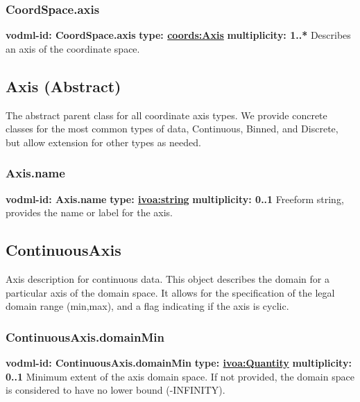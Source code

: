     \subsubsection{CoordSpace.axis}
      \textbf{vodml-id: CoordSpace.axis} \newline
      \textbf{type: \hyperref[sect:Axis]{coords:Axis}} \newline
      \textbf{multiplicity: 1..*} \newline 
      Describes an axis of the coordinate space.


  \subsection{Axis (Abstract)}
  \label{sect:Axis}
    The abstract parent class for all coordinate axis types. We provide concrete classes for the most common types of data, Continuous, Binned, and Discrete, but allow extension for other types as needed.

    \subsubsection{Axis.name}
      \textbf{vodml-id: Axis.name} \newline
      \textbf{type: \hyperref[sect:ivoa]{ivoa:string}} \newline
      \textbf{multiplicity: 0..1} \newline 
      Freeform string, provides the name or label for the axis.

  \subsection{ContinuousAxis}
  \label{sect:ContinuousAxis}
    Axis description for continuous data. This object describes the domain for a particular axis of the domain space. It allows for the specification of the legal domain range (min,max), and a flag indicating if the axis is cyclic.

    \subsubsection{ContinuousAxis.domainMin}
      \textbf{vodml-id: ContinuousAxis.domainMin} \newline
      \textbf{type: \hyperref[sect:ivoa]{ivoa:Quantity}} \newline
      \textbf{multiplicity: 0..1} \newline 
      Minimum extent of the axis domain space. If not provided, the domain space is considered to have no lower bound (-INFINITY).

